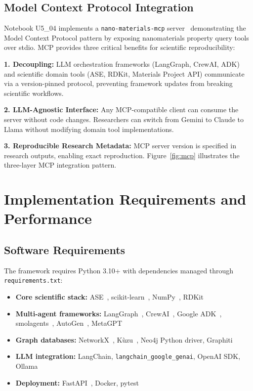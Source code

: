 \documentclass[11pt]{article}
\newcommand{\code}[1]{\texttt{#1}}
\begin{document}


\subsection{Model Context Protocol Integration}

Notebook U5\_04 implements a \code{nano-materials-mcp} server~\cite{MCP2024} demonstrating the Model Context Protocol pattern by exposing nanomaterials property query tools over stdio. MCP provides three critical benefits for scientific reproducibility:

\textbf{1. Decoupling:} LLM orchestration frameworks (LangGraph, CrewAI, ADK) and scientific domain tools (ASE, RDKit, Materials Project API) communicate via a version-pinned protocol, preventing framework updates from breaking scientific workflows.

\textbf{2. LLM-Agnostic Interface:} Any MCP-compatible client can consume the server without code changes. Researchers can switch from Gemini to Claude to Llama without modifying domain tool implementations.

\textbf{3. Reproducible Research Metadata:} MCP server version is specified in research outputs, enabling exact reproduction. Figure~\ref{fig:mcp} illustrates the three-layer MCP integration pattern.



\section{Implementation Requirements and Performance}

\subsection{Software Requirements}

The framework requires Python 3.10+ with dependencies managed through \code{requirements.txt}:

\begin{itemize}
    \item \textbf{Core scientific stack:} ASE~\cite{Larsen2017}, scikit-learn~\cite{Pedregosa2011}, NumPy~\cite{Harris2020}, RDKit
    \item \textbf{Multi-agent frameworks:} LangGraph~\cite{LangGraph2024}, CrewAI~\cite{CrewAI2024}, Google ADK~\cite{GoogleADK2025}, smolagents~\cite{Smolagents2024}, AutoGen~\cite{AutoGen2023}, MetaGPT~\cite{MetaGPT2023}
    \item \textbf{Graph databases:} NetworkX~\cite{NetworkX2008}, Kùzu~\cite{Kuzu2023}, Neo4j Python driver, Graphiti~\cite{Graphiti2024}
    \item \textbf{LLM integration:} LangChain, \code{langchain\_google\_genai}, OpenAI SDK, Ollama
    \item \textbf{Deployment:} FastAPI~\cite{FastAPI2018}, Docker, pytest
\end{itemize}
\end{document}
